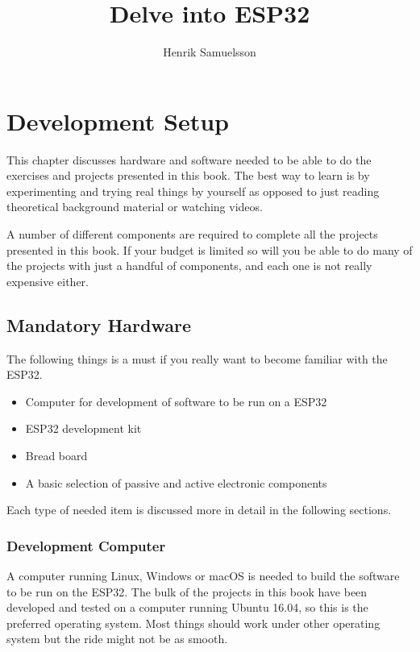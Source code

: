 \documentclass{tufte-book}
\title{Delve into ESP32}
\author{Henrik Samuelsson}
\begin{document}
	\maketitle
	
	\cleardoublepage
	\chapter*{Development Setup}
	
	This chapter discusses hardware and software needed to be able to do the exercises and projects presented in this book. The best way to learn is by experimenting and trying real things by yourself as opposed to just reading theoretical background material or watching videos.
	
	A number of different components are required to complete all the projects presented in this book. If your budget is limited so will you be  able to do many of the projects with just a handful of components, and each one is not really expensive either.
	
	\section{Mandatory Hardware}\label{sec:hardware}
	The following things is a must if you really want to become familiar with the ESP32.
	
	\begin{itemize}
		\item Computer for development of software to be run on a ESP32
		\item ESP32 development kit
		\item Bread board
		\item A basic selection of passive and active electronic components
	\end{itemize}
	
	Each type of needed item is discussed more in detail in the following sections.
	
	\subsection{Development Computer}
	A computer running Linux, Windows or macOS is needed to build the software to be run on the ESP32. The bulk of the projects in this book have been developed and tested on a computer running Ubuntu 16.04, so this is the preferred operating system. Most things should work under other operating system but the ride might not be as smooth.
	
\end{document}
